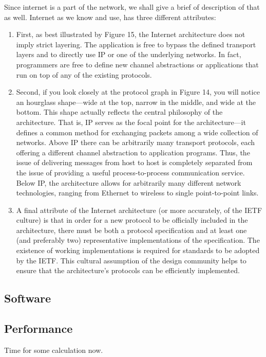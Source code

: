\documentclass[11pt, a4paper]{article}
\begin{document}
Since internet is a part of the network, we shall give a brief of description of that as well. Internet as we know and use, has three different attributes:
\begin{enumerate}
    \item First, as best illustrated by Figure 15, the Internet architecture does not imply strict layering. The application is free to bypass the defined transport layers and to directly use IP or one of the underlying networks. In fact, programmers are free to define new channel abstractions or applications that run on top of any of the existing protocols.
    
    \item Second, if you look closely at the protocol graph in Figure 14, you will notice an hourglass shape—wide at the top, narrow in the middle, and wide at the bottom. This shape actually reflects the central philosophy of the architecture. That is, IP serves as the focal point for the architecture—it defines a common method for exchanging packets among a wide collection of networks. Above IP there can be arbitrarily many transport protocols, each offering a different channel abstraction to application programs. Thus, the issue of delivering messages from host to host is completely separated from the issue of providing a useful process-to-process communication service. Below IP, the architecture allows for arbitrarily many different network technologies, ranging from Ethernet to wireless to single point-to-point links.
    \item A final attribute of the Internet architecture (or more accurately, of the IETF culture) is that in order for a new protocol to be officially included in the architecture, there must be both a protocol specification and at least one (and preferably two) representative implementations of the specification. The existence of working implementations is required for standards to be adopted by the IETF. This cultural assumption of the design community helps to ensure that the architecture’s protocols can be efficiently implemented.
\end{enumerate}

\subsection{Software}
\subsection{Performance}
Time for some calculation now.
\end{document}
